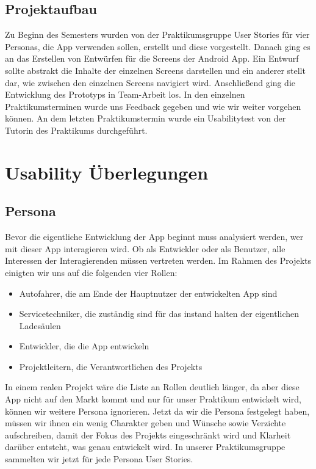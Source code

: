 \documentclass[utf8]{lni}
\begin{document}
\subsection{Projektaufbau}
Zu Beginn des Semesters wurden von der Praktikumsgruppe User Stories für vier Personas, die App verwenden sollen, erstellt und diese vorgestellt. Danach ging es an das Erstellen von Entwürfen für die Screens der Android App. Ein Entwurf sollte abstrakt die Inhalte der einzelnen Screens darstellen und ein anderer stellt dar, wie zwischen den einzelnen Screens navigiert wird. Anschließend ging die Entwicklung des Prototyps in Team-Arbeit los. In den einzelnen Praktikumsterminen wurde uns Feedback gegeben und wie wir weiter vorgehen können. An dem letzten Praktikumstermin wurde ein Usabilitytest von der Tutorin des Praktikums durchgeführt.

\section{Usability Überlegungen}
\subsection{Persona}

Bevor die eigentliche Entwicklung der App beginnt muss analysiert werden, wer mit dieser App interagieren wird. Ob als Entwickler oder als Benutzer, alle Interessen der Interagierenden müssen vertreten werden. Im Rahmen des Projekts einigten wir uns auf die folgenden vier Rollen:
\begin{itemize}
	\item Autofahrer, die am Ende der Hauptnutzer der entwickelten App sind
	\item Servicetechniker, die zuständig sind für das instand halten der eigentlichen Ladesäulen
	\item Entwickler, die die App entwickeln
	\item Projektleitern, die Verantwortlichen des Projekts
\end{itemize}

In einem realen Projekt wäre die Liste an Rollen deutlich länger, da aber diese App nicht auf den Markt kommt und nur für unser Praktikum entwickelt wird, können wir weitere Persona ignorieren.
Jetzt da wir die Persona festgelegt haben, müssen wir ihnen ein wenig Charakter geben und Wünsche sowie Verzichte aufschreiben, damit der Fokus des Projekts eingeschränkt wird und Klarheit darüber entsteht, was genau entwickelt wird. In unserer Praktikumsgruppe sammelten wir jetzt für jede Persona User Stories.
\end{document}
